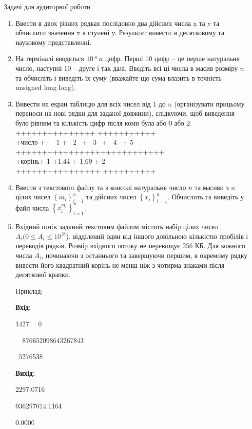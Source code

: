 \documentclass[]{article}
\makeatletter
\newcommand{\xslalph}[1]{\expandafter\@xslalph\csname c@#1\endcsname}
\newcommand{\@xslalph}[1]{%
    \ifcase#1\or а\or б\or в\or г\or д\or e\or є\or ж\or з\or i%
    \or й\or к\or л\or м\or н\or о\or п\or р\or с\or т%
    \or у\or ф\or х\or ц\or ч\or ш\or ю\or я\or аа\or бб\or вв%
    \else\@ctrerr\fi%
}
\makeatother
\begin{document}
\begin{enumerate}
\begin{enumerate}[label=\xslalph*)]
\begin{enumerate}
\begin{enumerate}[label=\xslalph*)]
Задачі для аудиторної роботи

\begin{enumerate}
\def\labelenumi{\arabic{enumi})}
\item
  Ввести в двох різних рядках послідовно два дійсних числа x та y та
  обчислити значення x в ступені y. Результат вивести в десятковому та
  науковому представленні.
\item
  На терміналі вводяться $10*n$ цифр. Перші 10 цифр -- це перше натуральне
  число, наступні 10 -- друге і так далі. Введіть всі ці числа в масив
  розміру $n$ та обчисліть і виведіть їх суму (вважайте що сума влазить в
  точність unsigned long long).
\item
  Вивести на екран таблицю для всіх чисел від 1 до $n$ 
 (організувати прицьому переноси на нові рядки для заданої довжини), 
  слідкуючи, щоб виведення було рівним та кількість цифр після коми була або 0 або 2:\\
+++++++++++++++ +++++++++++\\
+число ++ \ 1 + \ 2 \ + \ 3 \ + \ 4 \ + 5\\
++++++++++++++++++++++++++++\\
+корінь+ 1 +1.44 + 1.69 + 2\\
++++++++++++++++ ++++++++++

\item
  Ввести з текстового файлу та з консолі натуральне число $n$ та масиви з
  $n$ цілих чисел \(\left\{ m_{i} \right\}_{i = 1}^{n}\) та дійсних чисел
  \(\left\{ x_{i} \right\}_{i = 1}^{n}\). Обчислить та виведіть у файл
  числа \(\left\{ x_{i}^{m_{i}} \right\}_{i = 1}^{n}\).
\item
  Вхідний потік заданий текстовим файлом містить набір цілих чисел $A_i (0
  \le A_i \le 10^{18}$), відділений один від іншого довільною кількістю пробілів
  і переводів рядків. Розмір вхідного потоку не перевищує 256 КБ. Для
  кожного числа $A_i$, починаючи з останнього та завершуючи першим, в
  окремому рядку вивести його квадратний корінь не менш ніж з чотирма
  знаками після десяткової крапки.

Приклад:

\textbf{Вхід:}

1427 \ \ 0

 \ \ 876652098643267843

\ 5276538

\textbf{Вихід: }

2297.0716

936297014.1164

0.0000


\end{enumerate}
\end{enumerate}
\end{enumerate}
\end{enumerate}
\end{enumerate}
\end{document}
